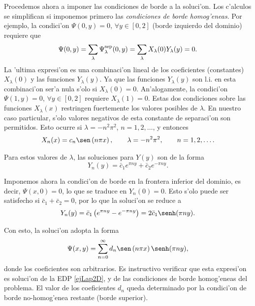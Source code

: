 Procedemos ahora a imponer las condiciones de borde a la soluci'on. Los c'alculos se simplifican si imponemos primero las \textit{condiciones de borde homog'eneas}. Por ejemplo, la condici'on $\Psi(0,y)=0$, $\forall y\in[0,2]$ (borde izquierdo del dominio) requiere que
\begin{equation}
\Psi(0,y) = \sum_{\lambda}\Psi_\lambda^{\rm sep}(0,y) = \sum_{\lambda}X_\lambda(0)Y_\lambda(y) = 0.
\end{equation}
La 'ultima expresi'on es una combinaci'on lineal de los coeficientes (constantes) $X_\lambda(0)$ y las funciones $Y_\lambda(y)$. Ya que las funciones $Y_\lambda(y)$ son l.i. en esta combinaci'on ser'a nula s'olo si $X_\lambda(0)=0$. An'alogamente, la condici'on 
$\Psi(1,y)=0$, $\forall y\in[0,2]$ requiere $X_\lambda(1)=0$. Estas dos condiciones sobre las funciones $X_\lambda(x)$ restringen fuertemente los valores posibles de $\lambda$. En nuestro caso particular, s'olo valores negativos de esta constante de separaci'on son permitidos. Esto ocurre si $\lambda = -n^2\pi^2$, $n=1,2,\dots$, y entonces
\begin{equation}
X_n(x)=c_n\sen\left(n\pi x\right), \qquad \lambda = -n^2\pi^2, \qquad n=1,2,\dots.
\end{equation}

Para estos valores de $\lambda$, las soluciones para $Y(y)$ son de la forma
\begin{equation}
Y_n(y) = \bar{c}_1e^{\pi ny} + \bar{c}_2e^{-\pi ny}.
\end{equation}

Imponemos ahora la condici'on de borde en la frontera inferior del dominio, es decir, $\Psi(x,0) = 0$, lo que se traduce en $Y_n(0)=0$. Esto s'olo puede ser satisfecho si $\bar{c}_1+\bar{c}_2=0$, por lo que la soluci'on se reduce a
\begin{equation}
Y_n(y) = \bar{c}_1\left(e^{\pi ny} -e^{-\pi ny}\right) = 2\bar{c}_1 \senh(\pi ny).
\end{equation}

Con esto, la soluci'on adopta la forma
\begin{equation}\label{ejLap2D2}
\Psi(x,y) = \sum_{n=0}^\infty d_n \sen\left(n\pi x\right)\senh(\pi ny),
\end{equation}
donde los coeficientes son arbitrarios. Es instructivo verificar que esta expresi'on es soluci'on de la EDP \eqref{ejLap2D}, y de las condiciones de borde homog'eneas del problema. El valor de los coeficientes $d_n$ queda determinado por la condici'on de borde no-homog'enea restante (borde superior).

